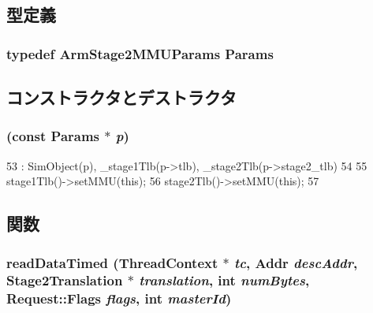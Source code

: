 \subsection{型定義}
\hypertarget{classArmISA_1_1Stage2MMU_a50e2496d982576d92f9f4df1918b73e0}{
\subsubsection[{Params}]{\setlength{\rightskip}{0pt plus 5cm}typedef ArmStage2MMUParams {\bf Params}}}
\label{classArmISA_1_1Stage2MMU_a50e2496d982576d92f9f4df1918b73e0}


\subsection{コンストラクタとデストラクタ}
\hypertarget{classArmISA_1_1Stage2MMU_a2ba240fe5b46f673d59a1472ea2fba90}{
\subsubsection[{Stage2MMU}]{ (const {\bf Params} $\ast$ {\em p})}}
\label{classArmISA_1_1Stage2MMU_a2ba240fe5b46f673d59a1472ea2fba90}



\begin{DoxyCode}
53     : SimObject(p), _stage1Tlb(p->tlb), _stage2Tlb(p->stage2_tlb)
54 {
55     stage1Tlb()->setMMU(this);
56     stage2Tlb()->setMMU(this);
57 }
\end{DoxyCode}


\subsection{関数}
\hypertarget{classArmISA_1_1Stage2MMU_a3798cb9b2fe75e8f40a2d2810824dd12}{
\subsubsection[{readDataTimed}]{ readDataTimed ({\bf ThreadContext} $\ast$ {\em tc}, \/  {\bf Addr} {\em descAddr}, \/  {\bf Stage2Translation} $\ast$ {\em translation}, \/  int {\em numBytes}, \/  {\bf Request::Flags} {\em flags}, \/  int {\em masterId})}}
\label{classArmISA_1_1Stage2MMU_a3798cb9b2fe75e8f40a2d2810824dd12}



